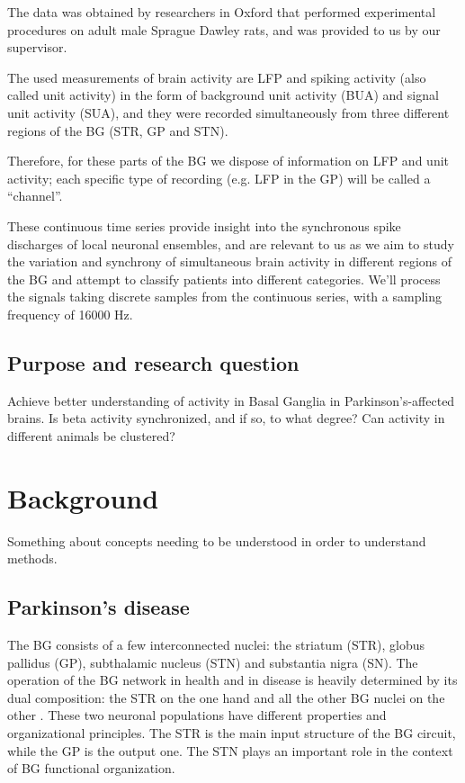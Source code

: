 \documentclass{article}
\begin{document}
The data was obtained by researchers in Oxford that performed experimental procedures on adult male Sprague Dawley rats, and was provided to us by our supervisor.

The used measurements of brain activity are LFP and spiking activity (also called unit activity) in the form of background unit activity (BUA) and signal unit activity (SUA), and they were recorded simultaneously from three different regions of the BG (STR, GP and STN).

Therefore, for these parts of the BG we dispose of information on LFP and unit activity; each specific type of recording (e.g. LFP in the GP) will be called a “channel”.

These continuous time series provide insight into the synchronous spike discharges of local neuronal ensembles, and are relevant to us as we aim to study the variation and synchrony of simultaneous brain activity in different regions of the BG and attempt to classify patients into different categories. We’ll process the signals taking discrete samples from the continuous series, with a sampling frequency of 16000 Hz.


\subsection{Purpose and research question}
Achieve better understanding of activity in Basal Ganglia in Parkinson's-affected brains.
Is beta activity synchronized, and if so, to what degree?
Can activity in different animals be clustered?

\newpage
\section{Background}
Something about concepts needing to be understood in order to understand methods.

\subsection{Parkinson's disease}
The BG consists of a few interconnected nuclei: the striatum (STR), globus pallidus (GP), subthalamic nucleus (STN) and substantia nigra (SN). The operation of the BG network in health and in disease is heavily determined by its dual composition: the STR on the one hand and all the other BG nuclei on the other \citep{DeMaags}. These two neuronal populations have different properties and organizational principles.
The STR is the main input structure of the BG circuit, while the GP is the output one. The STN plays an important role in the context of BG functional organization.
\end{document}
